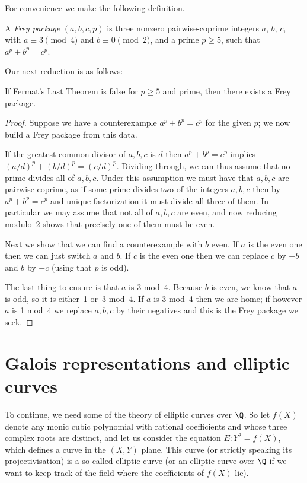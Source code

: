 For convenience we make the following definition.

\begin{definition}\label{FreyPackage}\leanok A \emph{Frey package} $(a,b,c,p)$
is three nonzero pairwise-coprime integers $a$, $b$, $c$, with $a\equiv3\pmod4$ and $b\equiv0\pmod2$,
and a prime $p\geq5$, such that $a^p+b^p=c^p$.\end{definition}

Our next reduction is as follows:

\begin{lemma}
  \label{FreyPackage.of_not_FermatLastTheorem_p_ge_5}
  \leanok
  If Fermat's Last Theorem is false for $p \ge 5$ and prime, then there exists a Frey package.
\end{lemma}
\begin{proof}
  \leanok
  Suppose we have a counterexample $a^p+b^p=c^p$ for the given $p$; we now build a Frey package from this data.

  If the greatest common divisor of $a,b,c$ is $d$ then $a^p+b^p=c^p$ implies $(a/d)^p+(b/d)^p=(c/d)^p$.
  Dividing through, we can thus assume that no prime divides all of $a,b,c$. Under this assumption we
  must have that $a,b,c$ are pairwise coprime, as if some prime divides two of the integers $a,b,c$
  then by $a^p+b^p=c^p$ and unique factorization it must divide all three of them.
  In particular we may assume that not all of $a,b,c$ are even, and now reducing modulo~2 shows
  that precisely one of them must be even.

  Next we show that we can find a counterexample with $b$ even. If $a$ is the even one then we can
  just switch $a$ and $b$. If $c$ is the even one then we can replace $c$ by $-b$ and $b$ by $-c$
  (using that $p$ is odd).

  The last thing to ensure is that $a$ is 3 mod~4. Because $b$ is even, we know that $a$ is odd,
  so it is either~1 or~3 mod~4. If $a$ is 3 mod~4 then we are home; if however $a$ is 1 mod~4 we
  replace $a,b,c$ by their negatives and this is the Frey package we seek.
\end{proof}

\section{Galois representations and elliptic curves}\label{twopointfour}

To continue, we need some of the theory of elliptic curves over $\Q$. So let $f(X)$ denote any
monic cubic polynomial with rational coefficients and whose three complex roots are distinct,
and let us consider the equation $E:Y^2=f(X)$, which defines a curve in the $(X,Y)$ plane.
This curve (or strictly speaking its projectivisation) is a so-called elliptic curve
(or an elliptic curve over $\Q$ if we want to keep track of the field where the coefficients
of $f(X)$ lie).

